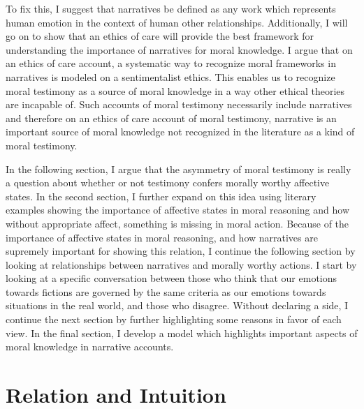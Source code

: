 \documentclass[phdthesis,12pt,final,a4paper]{wuthesis}
\theoremstyle{definition}
\theoremstyle{definition}
\theoremstyle{definition}
\theoremstyle{definition}
\theoremstyle{remark}
\begin{document}
To fix this, I suggest that narratives be defined as any work which represents human emotion in the context of human other relationships. Additionally, I will go on to show that an ethics of care will provide the best framework for understanding the importance of narratives for moral knowledge. I argue that on an ethics of care account, a systematic way to recognize moral frameworks in narratives is modeled on a sentimentalist ethics. This enables us to recognize moral testimony as a source of moral knowledge in a way other ethical theories are incapable of. Such accounts of moral testimony necessarily include narratives and therefore on an ethics of care account of moral testimony, narrative is an important source of moral knowledge not recognized in the literature as a kind of moral testimony.

In the following section, I argue that the asymmetry of moral testimony is really a question about whether or not testimony confers morally worthy affective states. In the second section, I further expand on this idea using literary examples showing the importance of affective states in moral reasoning and how without appropriate affect, something is missing in moral action. Because of the importance of affective states in moral reasoning, and how narratives are supremely important for showing this relation, I continue the following section by looking at relationships between narratives and morally worthy actions. I start by looking at a specific conversation between those who think that our emotions towards fictions are governed by the same criteria as our emotions towards situations in the real world, and those who disagree. Without declaring a side, I continue the next section by further highlighting some reasons in favor of each view. In the final section, I develop a model which highlights important aspects of moral knowledge in narrative accounts.

\chapter{Relation and Intuition}\label{rel-int}
\end{document}
